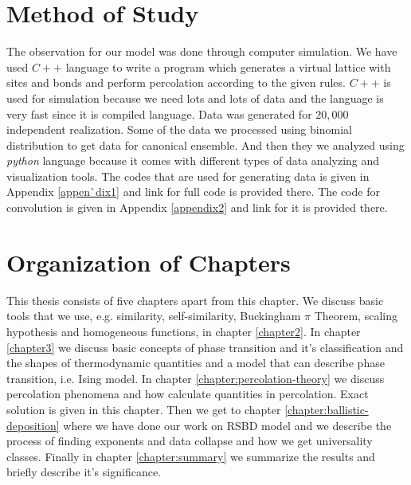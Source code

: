\section{Method of Study}  %
The observation for our model was done through computer simulation. We have used $C++$ language to write a program which generates a virtual lattice with sites and bonds and perform percolation according to the given rules. $C++$ is used for simulation because we need lots and lots of data and the language is very fast since it is compiled language. Data was generated for $20,000$ independent realization. Some of the data we processed using binomial distribution \cite{Newman2001} to get data for canonical ensemble. And then they we analyzed using \textit{python} language because it comes with different types of data analyzing and visualization tools. The codes that are used for generating data is given in Appendix \ref{appen`dix1} and link for full code is provided there. The code for convolution is given in Appendix \ref{appendix2} and link for it is provided there.

\section{Organization of Chapters}
	This thesis consists of five chapters apart from this chapter. We discuss basic tools that we use, e.g. similarity, self-similarity, Buckingham $\pi$ Theorem, scaling hypothesis and homogeneous functions, in chapter \ref{chapter2}. In chapter \ref{chapter3} we discuss basic concepts of phase transition and it's classification and the shapes of thermodynamic quantities and a model that can describe phase transition, i.e. Ising model. In chapter \ref{chapter:percolation-theory} we discuss percolation phenomena and how calculate quantities in percolation. Exact solution is given in this chapter. Then we get to chapter \ref{chapter:ballistic-deposition} where we have done our work on RSBD model and we describe the process of finding exponents and data collapse and how we get universality classes. Finally in chapter \ref{chapter:summary} we summarize the results and briefly describe it's significance.

